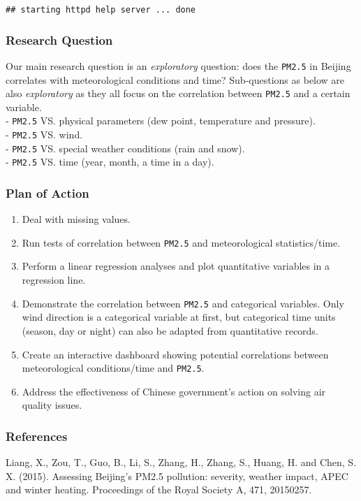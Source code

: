\documentclass[]{article}
\providecommand{\tightlist}{%
  \setlength{\itemsep}{0pt}\setlength{\parskip}{0pt}}
\begin{document}
\begin{verbatim}
## starting httpd help server ... done
\end{verbatim}

\hypertarget{research-question}{%
\subsubsection{Research Question}\label{research-question}}

Our main research question is an \emph{exploratory} question: does the
\texttt{PM2.5} in Beijing correlates with meteorological conditions and
time? Sub-questions as below are also \emph{exploratory} as they all
focus on the correlation between \texttt{PM2.5} and a certain
variable.\\
- \texttt{PM2.5} VS. physical parameters (dew point, temperature and
pressure).\\
- \texttt{PM2.5} VS. wind.\\
- \texttt{PM2.5} VS. special weather conditions (rain and snow).\\
- \texttt{PM2.5} VS. time (year, month, a time in a day).

\hypertarget{plan-of-action}{%
\subsubsection{Plan of Action}\label{plan-of-action}}

\begin{enumerate}
\def\labelenumi{\arabic{enumi}.}
\tightlist
\item
  Deal with missing values.
\item
  Run tests of correlation between \texttt{PM2.5} and meteorological
  statistics/time.
\item
  Perform a linear regression analyses and plot quantitative variables
  in a regression line.
\item
  Demonstrate the correlation between \texttt{PM2.5} and categorical
  variables. Only wind direction is a categorical variable at first, but
  categorical time units (season, day or night) can also be adapted from
  quantitative records.
\item
  Create an interactive dashboard showing potential correlations between
  meteorological conditions/time and \texttt{PM2.5}.
\item
  Address the effectiveness of Chinese government's action on solving
  air quality issues.
\end{enumerate}

\hypertarget{references}{%
\subsubsection{References}\label{references}}

Liang, X., Zou, T., Guo, B., Li, S., Zhang, H., Zhang, S., Huang, H. and
Chen, S. X. (2015). Assessing Beijing's PM2.5 pollution: severity,
weather impact, APEC and winter heating. Proceedings of the Royal
Society A, 471, 20150257.
\end{document}
